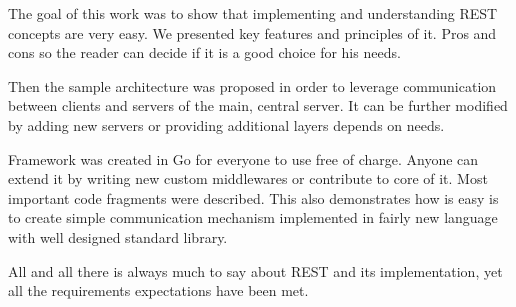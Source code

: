 The goal of this work was to show that implementing and understanding REST concepts are very easy. We presented key features and principles of it. Pros and cons so the reader can decide if it is a good choice for his needs.

Then the sample architecture was proposed in order to leverage communication between clients and servers of the main, central server. It can be further modified by adding new servers or providing additional layers depends on needs.

Framework was created in Go for everyone to use free of charge. Anyone can extend it by writing new custom middlewares or contribute to core of it. Most important code fragments were described. This also demonstrates how is easy is to create simple communication mechanism implemented in fairly new language with well designed standard library.

All and all there is always much to say about REST and its implementation, yet all the requirements expectations have been met.
